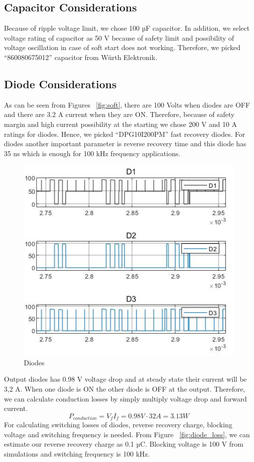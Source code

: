 \documentclass{article}
\begin{document}
\subsection{Capacitor Considerations}
Because of ripple voltage limit, we chose 100 µF capacitor. In addition, we select voltage rating of capacitor as 50 V because of safety limit and possibility of voltage oscillation in case of soft start does not working. Therefore, we picked “860080675012” capacitor from Würth Elektronik.
\subsection{Diode Considerations}
As can be seen from Figures ~\ref{fig:soft}, there are 100 Volts when diodes are OFF and there are 3.2 A current when they are ON. Therefore, because of safety margin and high current possibility at the starting we chose 200 V and 10 A ratings for diodes. Hence, we picked “DPG10I200PM” fast recovery diodes. For diodes another important parameter is reverse recovery time and this diode has 35 ns which is enough for 100 kHz frequency applications.
\begin{figure}[H]
    \centering
    \includegraphics[width=0.5\linewidth]{diodes.jpg}
    \caption {Diodes}
    \label{fig:diodes}
\end{figure}
Output diodes has 0.98 V voltage drop and at steady state their current will be 3,2 A. When one diode is ON the other diode is OFF at the output. Therefore, we can calculate conduction losses by simply multiply voltage drop and forward current.
\begin{equation}
    P_{conduction}=V_fI_f=0.98V\cdot 32A=3.13 W
\end{equation}
For calculating switching losses of diodes, reverse recovery charge, blocking voltage and switching frequency is needed. From Figure ~\ref{fig:diode_loss}, we can estimate our reverse recovery charge as 0.1 µC. Blocking voltage is 100 V from simulations and switching frequency is 100 kHz.
\end{document}
